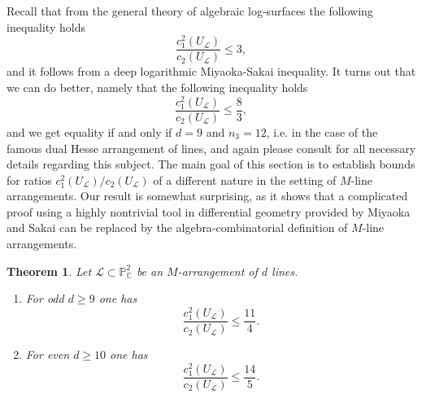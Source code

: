 \documentclass[12pt]{article}
\theoremstyle{plain}
\newtheorem{theorem}[thm]{Theorem}
\theoremstyle{definition}
\begin{document}
Recall that from the general theory of algebraic log-surfaces the following inequality holds
$$\dfrac{c_{1}^{2}(U_{\mathcal{L}})}{c_{2}(U_{\mathcal{L}})} \leq 3,$$
and it follows from a deep logarithmic Miyaoka-Sakai inequality. It turns out that we can do better, namely that the following inequality holds
$$\dfrac{c_{1}^{2}(U_{\mathcal{L}})}{c_{2}(U_{\mathcal{L}})} \leq \frac{8}{3},$$
and we get equality if and only if $d=9$ and $n_{3}=12$, i.e. in the case of the famous dual Hesse arrangement of lines, and again please consult \cite{BP} for all necessary details regarding this subject. The main goal of this section is to establish bounds for ratios $c_{1}^{2}(U_{\mathcal{L}}) / c_{2}(U_{\mathcal{L}})$ of a different nature in the setting of $M$-line arrangements. Our result is somewhat surprising, as it shows that a complicated proof using a highly nontrivial tool in differential geometry provided by Miyaoka and Sakai can be replaced by the algebra-combinatorial definition of $M$-line arrangements.
\begin{theorem}
Let $\mathcal{L} \subset \mathbb{P}^{2}_{\mathbb{C}}$ be an $M$-arrangement of $d$ lines.
\begin{enumerate}
\item[a)] For odd $d\geq 9$ one has
$$\dfrac{c_{1}^{2}(U_{\mathcal{L}})}{c_{2}(U_{\mathcal{L}})} \leq \frac{11}{4}.$$
\item[b)] For even $d\geq 10$ one has
$$\dfrac{c_{1}^{2}(U_{\mathcal{L}})}{c_{2}(U_{\mathcal{L}})} \leq \frac{14}{5}.$$
\end{enumerate}
\end{theorem}
\end{document}
